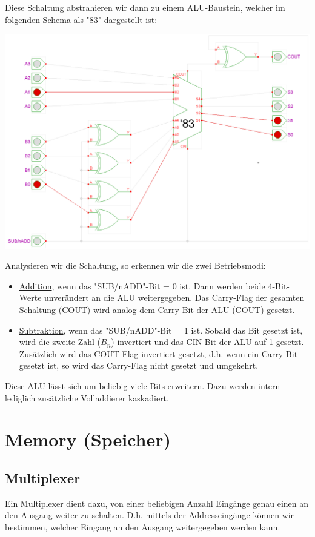 \documentclass{report}
\begin{document}
Diese Schaltung abstrahieren wir dann zu einem ALU-Baustein, welcher im folgenden Schema als "83" dargestellt ist:
\begin{center}\includegraphics[scale=0.2]{img/four-bit-alu.png}\end{center}
Analysieren wir die Schaltung, so erkennen wir die zwei Betriebsmodi:
\begin{itemize}
\item \underline{Addition}, wenn das "SUB/nADD"-Bit = 0 ist. Dann werden beide 4-Bit-Werte unverändert an die ALU weitergegeben. Das Carry-Flag der gesamten Schaltung (COUT) wird analog dem Carry-Bit der ALU (COUT) gesetzt.
\item \underline{Subtraktion}, wenn das "SUB/nADD"-Bit = 1 ist. Sobald das Bit gesetzt ist, wird die zweite Zahl ($B_n$) invertiert und das CIN-Bit der ALU auf 1 gesetzt. Zusätzlich wird das COUT-Flag invertiert gesetzt, d.h. wenn ein Carry-Bit gesetzt ist, so wird das Carry-Flag nicht gesetzt und umgekehrt.
\end{itemize}
Diese ALU lässt sich um beliebig viele Bits erweitern. Dazu werden intern lediglich zusätzliche Volladdierer kaskadiert.
\newpage\section{Memory (Speicher)}
\subsection{Multiplexer}
Ein Multiplexer dient dazu, von einer beliebigen Anzahl Eingänge genau einen an den Ausgang weiter zu schalten. D.h. mittels der Addresseingänge können wir bestimmen, welcher Eingang an den Ausgang weitergegeben werden kann.
\end{document}
